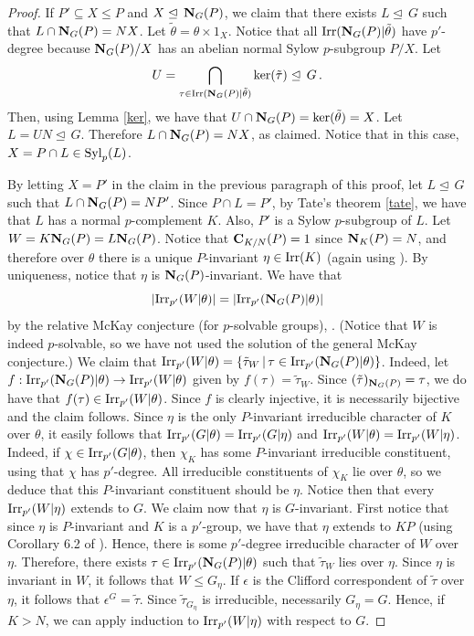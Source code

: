 \documentclass[12pt]{amsart}
\theoremstyle{plain}
\theoremstyle{definition}
\numberwithin{equation}{section}
\def\irrp#1{{\rm Irr}_{p'}(#1)}
\def\irr#1{{\rm Irr}(#1)}
\def\cent#1#2{{\bf C}_{#1}(#2)}
\def\syl#1#2{{\rm Syl}_#1(#2)}
\def\nor{\trianglelefteq\,}
\def\ker#1{{\rm ker}(#1)}
\def\norm#1#2{{\bf N}_{#1}(#2)}
\def\sbs{\subseteq}
\begin{document}
\begin{proof}
If $P' \sbs X \le P$ and $X \nor \norm GP$, we claim that there
exists $L\nor G$ such that $L\cap \norm GP=NX$. Let
$\tilde\theta=\theta \times 1_{X}$. Notice that all $\irr{\norm
GP|\tilde\theta}$ have $p'$-degree because $\norm GP/X$ has
an abelian normal Sylow $p$-subgroup $P/X$. Let
$$U=\bigcap_{\tau \in \irr{\norm GP|\tilde\theta}} \ker{\tilde\tau} \nor G \, .$$
Then, using Lemma \ref{ker}, we have that $U\cap \norm
GP=\ker{\tilde\theta}=X$. Let $L=UN \nor G$. Therefore $L\cap \norm
GP=NX$, as claimed. Notice that in this case, $X=P\cap L \in \syl p
L$.


\smallskip

By letting $X=P'$ in the claim in the previous paragraph of this
proof, let
 $L\nor G$ such that $L\cap \norm GP=NP'$. Since $P\cap L=P'$, by Tate's theorem \ref{tate},
  we have that $L$ has  a normal $p$-complement $K$.
  Also,   $P'$ is a Sylow $p$-subgroup of $L$. Let $W=K\norm GP=L\norm GP$.
 Notice that $\cent{K/N}P=1$ since $\norm KP=N$, and therefore
 over $\theta$ there is a unique
 $P$-invariant $\eta \in \irr K$ (again using \cite[Theorem 13.31 and Problem 13.10]{Is}). By uniqueness, notice that $\eta$ is $\norm GP$-invariant.  We have that
 $$|\irrp{W|\theta}|=|\irrp{\norm GP|\theta}|$$
by the relative McKay conjecture (for $p$-solvable groups),
\cite[Theorem 10.26]{N}. (Notice that $W$ is indeed $p$-solvable, so
we have not used the solution of the general McKay conjecture.) We claim that $\irrp{W|\theta}=\{\tilde\tau_W
\, |\, \tau \in \irrp{\norm GP|\theta}\}$.
Indeed, let $f:\irrp{\norm GP|\theta} \rightarrow \irrp{W|\theta}$
given by $f(\tau)=\tilde\tau_W$. Since $(\tilde\tau)_{\norm GP}=\tau$,
we do have that $f(\tau) \in \irrp{W|\theta}$. Since $f$ is clearly injective,
it is necessarily bijective and the claim follows.
Since $\eta$ is the only $P$-invariant irreducible
character of $K$ over $\theta$, it easily
follows that $\irrp{G|\theta}=\irrp{G|\eta}$ and
$\irrp{W|\theta}=\irrp{W|\eta}$.  Indeed,
if $\chi \in \irrp{G|\theta}$, then $\chi_K$ has some
$P$-invariant irreducible constituent, using that $\chi$ has $p'$-degree.
All irreducible constituents of $\chi_K$ lie over $\theta$,
so we deduce that this $P$-invariant constituent should be
$\eta$. Notice then that every ${\rm
Irr}_{p'}(W|\eta)$ extends to $G$.
We claim now that $\eta$ is $G$-invariant.
First notice that since $\eta$ is $P$-invariant and $K$ is
a $p'$-group, we have that $\eta$ extends to
$KP$ (using Corollary 6.2 of \cite{N}). Hence, there is
some $p'$-degree irreducible character of $W$ over $\eta$.
Therefore, there exists $\tau \in \irrp{\norm GP|\theta}$ such that
$\tilde\tau_W$ lies over $\eta$. Since $\eta$ is invariant in $W$,
it follows that $W \le G_\eta$. If $\epsilon $ is the Clifford correspondent of
$\tilde\tau$ over $\eta$, it follows that $\epsilon^G=\tilde\tau$. Since
$\tilde\tau_{G_\eta}$ is irreducible, necessarily $G_\eta=G$.
Hence, if $K>N$, we can apply induction to $\irrp{W|\eta}$ with respect to $G$.



\end{proof}
\end{document}
